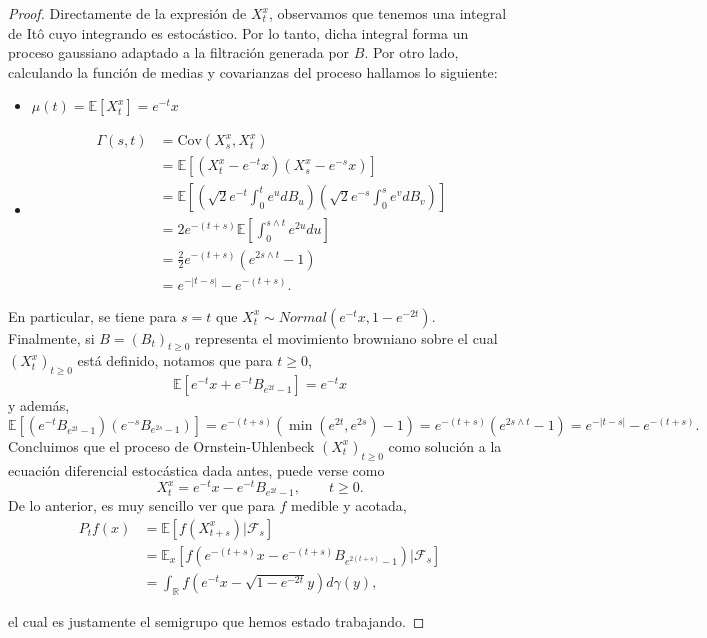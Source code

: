 \documentclass[letterpaper,twoside,12pt]{book}
\newcommand{\R}{\mathbb{R}}
\newcommand{\F}{\mathcal{F}}
\newcommand{\E}{\mathbb{E}}
\newcommand{\1}{\mathds{1}}
\theoremstyle{definition}
\theoremstyle{definition}
\theoremstyle{remark}
\theoremstyle{definition}
\theoremstyle{definition}
\theoremstyle{definition}
\theoremstyle{definition}
\theoremstyle{definition}
\begin{document}
\begin{proof}
     Directamente de la expresión de $X_t^{x}$, observamos que tenemos una integral de Itô cuyo integrando es estocástico. Por lo tanto, dicha integral forma un proceso gaussiano adaptado a la filtración generada por $B$. Por otro lado, calculando la función de medias y covarianzas del proceso hallamos lo siguiente:
     \begin{itemize}
        \item $\mu(t)=\E\left[X_t^{x}\right]=e^{-t}x$
        \item \begin{align*}\Gamma(s,t)&=\text{Cov}\left(X_s^x,X_t^x\right)\\
            &=\E\left[\left(X_t^{x}-e^{-t}x\right)\left(X_s^x-e^{-s}x\right)\right]\\
            &=\E\left[\left(\sqrt{2}e^{-t}\int_{0}^{t}e^{u}dB_u\right)\left(\sqrt{2}e^{-s}\int_{0}^{s}e^{v}dB_v\right)\right]\\
            &=2e^{-(t+s)}\E\left[\int_{0}^{s\wedge t}e^{2u}du\right]\\
            &=\frac{2}{2}e^{-(t+s)}(e^{2s\wedge t}-1)\\
            &=e^{-|t-s|}-e^{-(t+s)}.
        \end{align*}
     \end{itemize}
     En particular, se tiene para $s=t$ que $X_t^x\sim Normal(e^{-t}x,1-e^{-2t})$. Finalmente, si $B=(B_t)_{t\geq0}$ representa el movimiento browniano sobre el cual $(X_t^x)_{t\geq0}$ está definido, notamos que para $t\geq0$,
     \[
     \E\left[e^{-t}x+e^{-t}B_{e^{2t}-1}\right]=e^{-t}x
     \]
     y además, 
     \[
     \E\left[\left(e^{-t}B_{e^{2t}-1}\right) \left(e^{-s}B_{e^{2s}-1}\right)\right]=e^{-(t+s)}(\min(e^{2t},e^{2s})-1)=e^{-(t+s)}(e^{2s\wedge t}-1)=e^{-|t-s|}-e^{-(t+s)}.
     \]
     Concluimos que el proceso de Ornstein-Uhlenbeck $(X_t^{x})_{t\geq0}$ como solución a la ecuación diferencial estocástica dada antes, puede verse como 
     \[
        X_t^{x}=e^{-t}x-e^{-t}B_{e^{2t}-1}, \qquad t\geq0.
     \]
     De lo anterior, es muy sencillo ver que para $f$ medible y acotada, 
     \begin{align*}
      P_tf(x)&=\E\left[f(X_{t+s}^{x})|\F_s\right]\\
      &=\E_x\left[f(e^{-(t+s)}x-e^{-(t+s)}B_{e^{2(t+s)}-1})|\F_s\right]\\
      &=\int_\R f \left(e^{-t}x-\sqrt{1-e^{-2t}}y\right)d\gamma(y),
     \end{align*}
     
     el cual es justamente el semigrupo que hemos estado trabajando.
   \end{proof}
\end{document}

